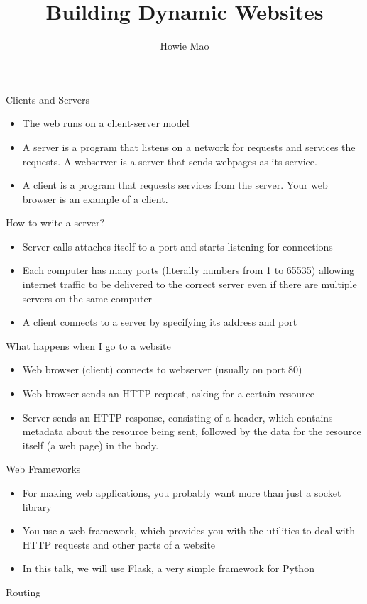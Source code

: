 \documentclass{beamer}
\title{Building Dynamic Websites}
\author{Howie Mao}
\begin{document}
\begin{frame}
	\titlepage
\end{frame}

\begin{frame}{Clients and Servers}
	\begin{itemize}
		\item The web runs on a client-server model
		\item A server is a program that listens on a network for requests
			and services the requests. A webserver is a server that sends
			webpages as its service.
		\item A client is a program that requests services from the server.
			Your web browser is an example of a client.
	\end{itemize}
\end{frame}

\begin{frame}{How to write a server?}
	\begin{itemize}
		\item Server calls attaches itself to a port and starts listening 
			for connections
		\item Each computer has many ports (literally numbers from 1 to 65535) 
			allowing internet traffic to be delivered to the correct
			server even if there are multiple servers on the same computer
		\item A client connects to a server by specifying its address and port
	\end{itemize}
\end{frame}

\begin{frame}{What happens when I go to a website}
	\begin{itemize}
		\item Web browser (client) connects to webserver (usually on port 80)
		\item Web browser sends an HTTP request, asking for a certain resource
		\item Server sends an HTTP response, consisting of a header,
			which contains metadata about the resource being sent, followed
			by the data for the resource itself (a web page) in the body.
	\end{itemize}
\end{frame}

\begin{frame}{Web Frameworks}
	\begin{itemize}
		\item For making web applications, you probably want more than just
			a socket library
		\item You use a web framework, which provides you with the utilities
			to deal with HTTP requests and other parts of a website
		\item In this talk, we will use Flask, a very simple framework for Python
	\end{itemize}
\end{frame}

\begin{frame}{Routing}
\end{frame}
\end{document}
